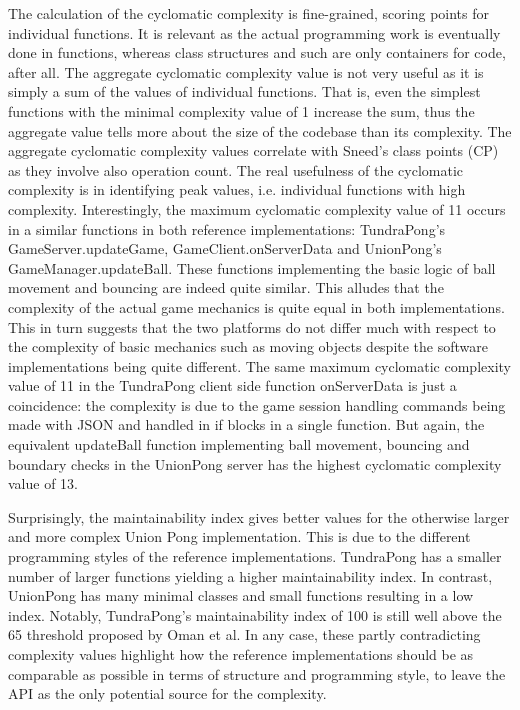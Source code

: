 \documentclass[conference]{IEEEtran}
\begin{document}
The calculation of the cyclomatic complexity is fine-grained, scoring
points for individual functions. It is relevant as the actual
programming work is eventually done in functions, whereas class
structures and such are only containers for code, after all. The
aggregate cyclomatic complexity value is not very useful as it is
simply a sum of the values of individual functions. That is, even the
simplest functions with the minimal complexity value of 1 increase the
sum, thus the aggregate value tells more about the size of the
codebase than its complexity. The aggregate cyclomatic complexity
values correlate with Sneed’s class points (CP) as they involve also
operation count. The real usefulness of the cyclomatic complexity is
in identifying peak values, i.e. individual functions with high
complexity. Interestingly, the maximum cyclomatic complexity value of
11 occurs in a similar functions in both reference implementations:
TundraPong’s GameServer.updateGame, GameClient.onServerData and
UnionPong’s GameManager.updateBall. These functions implementing the
basic logic of ball movement and bouncing are indeed quite
similar. This alludes that the complexity of the actual game mechanics
is quite equal in both implementations. This in turn suggests that the
two platforms do not differ much with respect to the complexity of
basic mechanics such as moving objects despite the software
implementations being quite different. The same maximum cyclomatic
complexity value of 11 in the TundraPong client side function
onServerData is just a coincidence: the complexity is due to the game
session handling commands being made with JSON and handled in if
blocks in a single function. But again, the equivalent updateBall
function implementing ball movement, bouncing and boundary checks in
the UnionPong server has the highest cyclomatic complexity value of
13.

Surprisingly, the maintainability index gives better values for the
otherwise larger and more complex Union Pong implementation. This is
due to the different programming styles of the reference
implementations. TundraPong has a smaller number of larger functions
yielding a higher maintainability index. In contrast, UnionPong has
many minimal classes and small functions resulting in a low
index. Notably, TundraPong’s maintainability index of 100 is still
well above the 65 threshold proposed by Oman et al. In any case, these
partly contradicting complexity values highlight how the reference
implementations should be as comparable as possible in terms of
structure and programming style, to leave the API as the only
potential source for the complexity.
\end{document}
